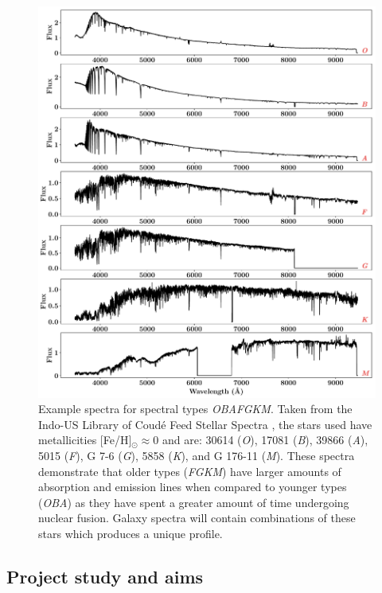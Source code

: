 \documentclass[12pt, twocolumn]{revtex4-1}    %
\begin{document}
\begin{figure}
\includegraphics[width=1.0\linewidth]{introduction/spectral_types}
\caption{Example spectra for spectral types \textit{OBAFGKM}. Taken from the Indo-US Library of Coudé Feed Stellar Spectra \citep{valdes_coude}, the stars used have metallicities [Fe/H]$_{\odot} \approx0$  and are: 30614 (\textit{O}), 17081 (\textit{B}), 39866 (\textit{A}), 5015 (\textit{F}), G 7-6 (\textit{G}), 5858 (\textit{K}), and G 176-11 (\textit{M}). These spectra demonstrate that older types (\textit{FGKM}) have larger amounts of absorption and emission lines when compared to younger types (\textit{OBA}) as they have spent a greater amount of time undergoing nuclear fusion. Galaxy spectra will contain combinations of these stars which produces a unique profile.}
\label{fig:spectral_types}
\end{figure}

\subsection{Project study and aims} %

\end{document}

